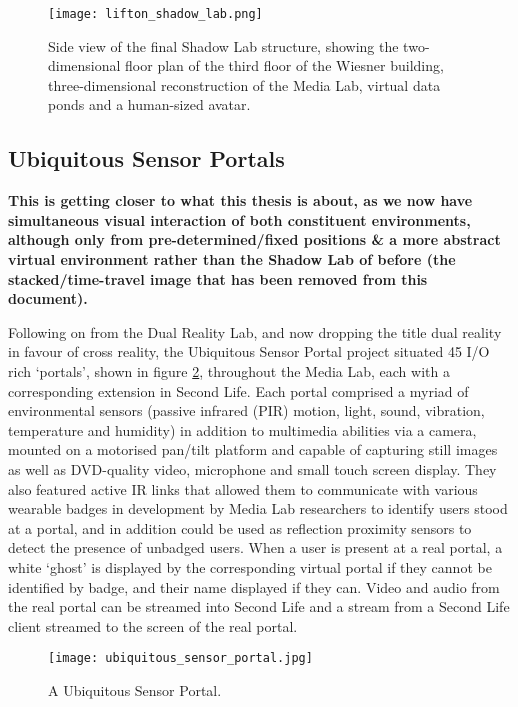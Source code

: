 \begin{figure}[h]
\centering
\texttt{[image: lifton\_shadow\_lab.png]}
\caption{Side view of the final Shadow Lab structure, showing the two-dimensional floor plan of the third floor of the Wiesner building, three-dimensional reconstruction of the Media Lab, virtual data ponds and a human-sized avatar.}
\label{lifton_shadow_lab.png}
\end{figure}

\subsection{Ubiquitous Sensor Portals}

\textbf{This is getting closer to what this thesis is about, as we now have simultaneous visual interaction of both constituent environments, although only from pre-determined/fixed positions \& a more abstract virtual environment rather than the Shadow Lab of before (the stacked/time-travel image that has been removed from this document).}

Following on from the Dual Reality Lab, and now dropping the title dual reality in favour of cross reality, the Ubiquitous Sensor Portal project situated 45 I/O rich `portals', shown in figure \ref{ubiquitous_sensor_portal.jpg}, throughout the Media Lab, each with a corresponding extension in Second Life. Each portal comprised a myriad of environmental sensors (passive infrared (PIR) motion, light, sound, vibration, temperature and humidity) in addition to multimedia abilities via a camera, mounted on a motorised pan/tilt platform and capable of capturing still images as well as DVD-quality video, microphone and small touch screen display. They also featured active IR links that allowed them to communicate with various wearable badges in development by Media Lab researchers to identify users stood at a portal, and in addition could be used as reflection proximity sensors to detect the presence of unbadged users. When a user is present at a real portal, a white `ghost' is displayed by the corresponding virtual portal if they cannot be identified by badge, and their name displayed if they can. Video and audio from the real portal can be streamed into Second Life and a stream from a Second Life client streamed to the screen of the real portal.

\begin{figure}[h]
\centering
\texttt{[image: ubiquitous\_sensor\_portal.jpg]}
\caption{A Ubiquitous Sensor Portal.}
\label{ubiquitous_sensor_portal.jpg}
\end{figure}

